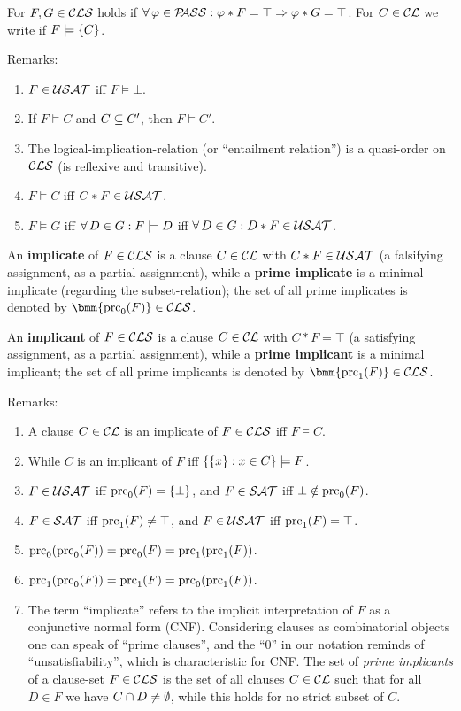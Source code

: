 \documentclass[]{book}
\begin{document}
\begin{defi}\label{def:models}
  For $F, G \in \mathcal{CLS}$ holds  if $\forall\, \varphi \in \mathcal{P\hspace{-0.32em}ASS} : \varphi * F = \top \Rightarrow \varphi * G = \top$. For $C \in \mathcal{CL}$ we write  if $F \models \{ C \}$.
\end{defi}
Remarks:
\begin{enumerate}
\item $F \in \mathcal{USAT}$ iff $F \models \bot$.
\item If $F \models C$ and $C \subseteq C'$, then $F \models C'$.
\item The logical-implication-relation (or ``entailment relation'') is a quasi-order on $\mathcal{CLS}$ (is reflexive and transitive).
\item $F \models C$ iff $C * F \in \mathcal{USAT}$.
\item $F \models G$ iff $\forall\, D \in G : F \models D$ iff $\forall\, D \in G : D * F \in \mathcal{USAT}$.
\end{enumerate}

\begin{defi}\label{def:primec}
  An \textbf{implicate} of $F \in \mathcal{CLS}$ is a clause $C \in \mathcal{CL}$ with $C* F \in \mathcal{USAT}$ (a falsifying assignment, as a partial assignment), 
  while a \textbf{prime implicate} is a minimal implicate (regarding the subset-relation); the set of all prime implicates is denoted by 
  $\bmm{\primec_0(F)} \in \Cls$.

  An \textbf{implicant} of $F \in \mathcal{CLS}$ is a clause $C \in \mathcal{CL}$ with $C * F = \top$ (a satisfying assignment, as a partial assignment), 
  while a \textbf{prime implicant} is a minimal implicant; the set of all prime implicants is denoted by $\bmm{\primec_1(F)} \in \Cls$.
\end{defi}
Remarks:
\begin{enumerate}
      \item A clause $C \in \mathcal{CL}$ is an implicate of $F \in \mathcal{CLS}$ iff $F \models C$.
      \item While $C$ is an implicant of $F$ iff $\{ \{ x \} :x \in C \} \models F$.
      \item $F \in \mathcal{USAT}$ iff $\operatorname{prc}_0(F) = \{ \bot \}$, and $F \in \mathcal{SAT}$ iff $\bot \notin \operatorname{prc}_0(F)$.
      \item $F \in \mathcal{SAT}$ iff $\operatorname{prc}_1(F) \ne \top$, and $F \in \mathcal{USAT}$ iff $\operatorname{prc}_1(F) = \top$.
      \item $\operatorname{prc}_0(\operatorname{prc}_0(F)) = \operatorname{prc}_0(F) = \operatorname{prc}_1(\operatorname{prc}_1(F))$.
      \item $\operatorname{prc}_1(\operatorname{prc}_0(F)) = \operatorname{prc}_1(F) = \operatorname{prc}_0(\operatorname{prc}_1(F))$.
      \item  The term ``implicate'' refers to the implicit interpretation of $F$ as a conjunctive normal form (CNF). Considering clauses as combinatorial objects 
	  one can speak of ``prime clauses'', and the ``$0$'' in our notation reminds of ``unsatisfiability'', which is characteristic for CNF.  
	  The set of \emph{prime implicants} of a clause-set $F \in \mathcal{CLS}$ is the set of all clauses $C \in \mathcal{CL}$ such that for all $D \in F$ we have $C \cap D \not= \emptyset$, while this holds 
	  for no strict subset of $C$.
\end{enumerate}
\end{document}
